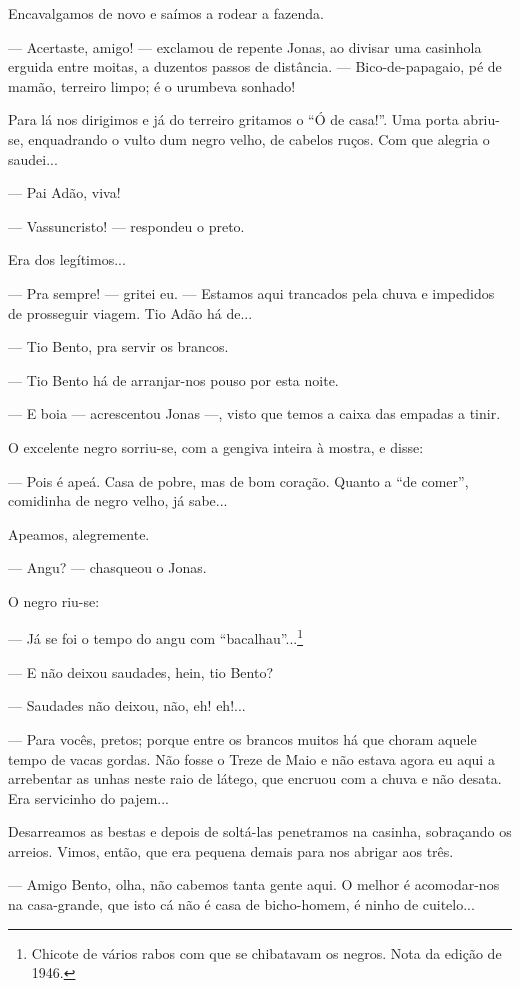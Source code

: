 Encavalgamos de novo e saímos a rodear a fazenda.

--- Acertaste, amigo! --- exclamou de repente Jonas, ao divisar uma
casinhola erguida entre moitas, a duzentos passos de distância. ---
Bico-de-papagaio, pé de mamão, terreiro limpo; é o urumbeva sonhado!

Para lá nos dirigimos e já do terreiro gritamos o ``Ó de casa!''. Uma
porta abriu-se, enquadrando o vulto dum negro velho, de cabelos ruços.
Com que alegria o saudei...

--- Pai Adão, viva!

--- Vassuncristo! --- respondeu o preto.

Era dos legítimos...

--- Pra sempre! --- gritei eu. --- Estamos aqui trancados pela chuva e
impedidos de prosseguir viagem. Tio Adão há de...

--- Tio Bento, pra servir os brancos.

--- Tio Bento há de arranjar-nos pouso por esta noite.

--- E boia --- acrescentou Jonas ---, visto que temos a caixa das
empadas a tinir.

O excelente negro sorriu-se, com a gengiva inteira à mostra, e disse:

--- Pois é apeá. Casa de pobre, mas de bom coração. Quanto a ``de
comer'', comidinha de negro velho, já sabe...

Apeamos, alegremente.

--- Angu? --- chasqueou o Jonas.

O negro riu-se:

--- Já se foi o tempo do angu com ``bacalhau''...\footnote{Chicote de
  vários rabos com que se chibatavam os negros. Nota da edição de 1946.}

--- E não deixou saudades, hein, tio Bento?

--- Saudades não deixou, não, eh! eh!...

--- Para vocês, pretos; porque entre os brancos muitos há que choram
aquele tempo de vacas gordas. Não fosse o Treze de Maio e não estava
agora eu aqui a arrebentar as unhas neste raio de látego, que encruou
com a chuva e não desata. Era servicinho do pajem...

Desarreamos as bestas e depois de soltá-las penetramos na casinha,
sobraçando os arreios. Vimos, então, que era pequena demais para nos
abrigar aos três.

--- Amigo Bento, olha, não cabemos tanta gente aqui. O melhor é
acomodar-nos na casa-grande, que isto cá não é casa de bicho-homem, é
ninho de cuitelo...

